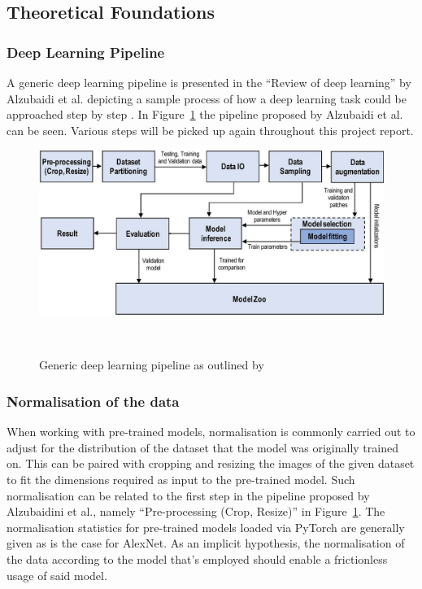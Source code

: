\subsection{Theoretical Foundations}\label{foundations}


\subsubsection{Deep Learning Pipeline}
A generic deep learning pipeline is presented in the ``Review of deep learning'' by Alzubaidi et al\@. depicting a sample process of how a deep learning task could be approached step by step \citep{alzubaidi2021review}. In Figure~\ref{fig:pipeline} the pipeline proposed by Alzubaidi et al\@. can be seen. Various steps will be picked up again throughout this project report.
\begin{figure}[ht]
	\centering
	\includegraphics[scale=0.26]{./figures/Pipeline.png}
	\caption{Generic deep learning pipeline as outlined by\citeauthor{alzubaidi2021review}}~\label{fig:pipeline}
\end{figure}

\subsubsection{Normalisation of the data}
When working with pre-trained models, normalisation is commonly carried out to adjust for the distribution of the dataset that the model was originally trained on. This can be paired with cropping and resizing the images of the given dataset to fit the dimensions required as input to the pre-trained model. Such normalisation can be related to the first step in the pipeline proposed by Alzubaidini et al., namely  ``Pre-processing (Crop, Resize)'' in Figure~\ref{fig:pipeline}. The normalisation statistics for pre-trained models loaded via PyTorch are generally given as is the case for AlexNet\citep{pytorchAlexNet}. As an implicit hypothesis, the normalisation of the data according to the model that's employed should enable a frictionless usage of said model.


